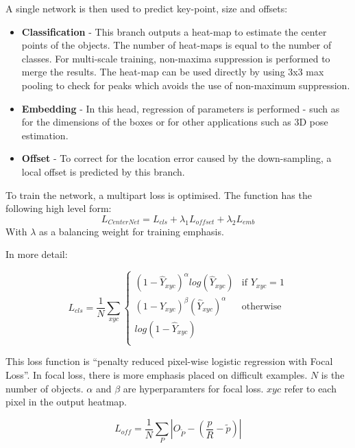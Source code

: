 \documentclass[a4paper,twoside,12pt]{report}
\begin{document}
A single network is then used to predict key-point, size and offsets: 
\begin{itemize}
    \setlength\itemsep{0em}
    \item \textbf{Classification} - This branch outputs a heat-map to estimate the center points of the objects. The number of heat-maps is equal to the number of classes. For multi-scale training, non-maxima suppression is performed to merge the results. The heat-map can be used directly by using 3x3 max pooling to check for peaks which avoids the use of non-maximum suppression. 
    
    \item \textbf{Embedding} - In this head, regression of parameters is performed - such as for the dimensions of the boxes or for other applications such as 3D pose estimation.
    
    \item \textbf{Offset} - To correct for the location error caused by the down-sampling, a local offset is predicted by this branch.
\end{itemize}

To train the network, a multipart loss is optimised. The function has the following high level form:
\begin{equation}
L_{CenterNet} =  L_{cls} + \lambda_1 L_{offset} + \lambda_2 L_{emb} 
\end{equation} 
With $\lambda$ as a balancing weight for training emphasis.

In more detail:

\begin{equation}
L_{cls} =  \frac{1}{N} \sum_{xyc}
    \begin{cases}
      (1-\hat{Y}_{xyc})^{\alpha}log(\hat{Y}_{xyc}) & \text{if $Y_{xyc}=1$}\\
      (1-Y_{xyc})^{\beta}(\hat{Y}_{xyc})^{\alpha} & \text{otherwise}\\
      log(1-\hat{Y}_{xyc})\\
    \end{cases} 
\end{equation}

This loss function is ``penalty reduced pixel-wise logistic regression with Focal Loss''. In focal loss, there is more emphasis placed on difficult examples. $N$ is the number of objects. $\alpha$ and $\beta$ are hyperparamters for focal loss. $xyc$ refer to each pixel in the output heatmap.

\begin{equation}
L_{off} =  \frac{1}{N} \sum_{P} |\hat{O}_{\tilde{P}}-(\frac{p}{R}-\tilde{p})|
\end{equation}
\end{document}
